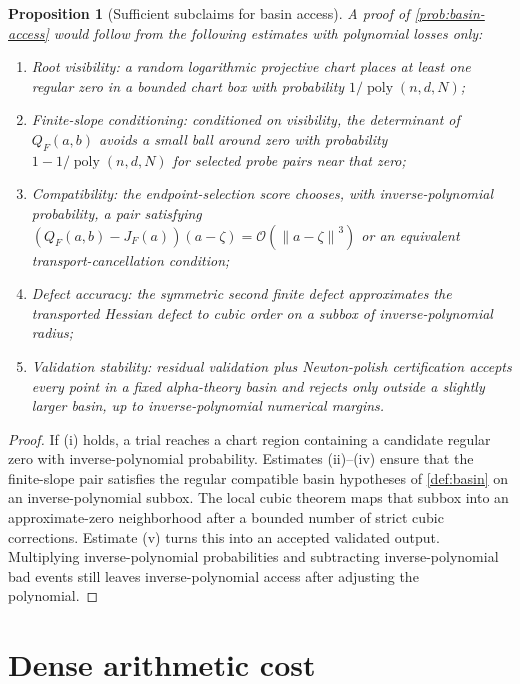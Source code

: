 \documentclass[11pt]{article}
\newtheorem{proposition}[definition]{Proposition}
\newcommand{\OO}{\mathcal O}
\newcommand{\poly}{\operatorname{poly}}
\newcommand{\norm}[1]{\left\lVert #1\right\rVert}
\begin{document}
\begin{proposition}[Sufficient subclaims for basin access]\label{prop:subclaims}
A proof of \cref{prob:basin-access} would follow from the following estimates with polynomial losses only:
\begin{enumerate}[label=(\roman*)]
\item \emph{Root visibility:} a random logarithmic projective chart places at least one regular zero in a bounded chart box with probability $1/\poly(n,d,N)$;
\item \emph{Finite-slope conditioning:} conditioned on visibility, the determinant of $Q_F(a,b)$ avoids a small ball around zero with probability $1-1/\poly(n,d,N)$ for selected probe pairs near that zero;
\item \emph{Compatibility:} the endpoint-selection score chooses, with inverse-polynomial probability, a pair satisfying $(Q_F(a,b)-J_F(a))(a-\zeta)=\OO(\norm{a-\zeta}^3)$ or an equivalent transport-cancellation condition;
\item \emph{Defect accuracy:} the symmetric second finite defect approximates the transported Hessian defect to cubic order on a subbox of inverse-polynomial radius;
\item \emph{Validation stability:} residual validation plus Newton-polish certification accepts every point in a fixed alpha-theory basin and rejects only outside a slightly larger basin, up to inverse-polynomial numerical margins.
\end{enumerate}
\end{proposition}

\begin{proof}
If (i) holds, a trial reaches a chart region containing a candidate regular zero with inverse-polynomial probability.  Estimates (ii)--(iv) ensure that the finite-slope pair satisfies the regular compatible basin hypotheses of \cref{def:basin} on an inverse-polynomial subbox.  The local cubic theorem maps that subbox into an approximate-zero neighborhood after a bounded number of strict cubic corrections.  Estimate (v) turns this into an accepted validated output.  Multiplying inverse-polynomial probabilities and subtracting inverse-polynomial bad events still leaves inverse-polynomial access after adjusting the polynomial.
\end{proof}

\section{Dense arithmetic cost}
\end{document}
